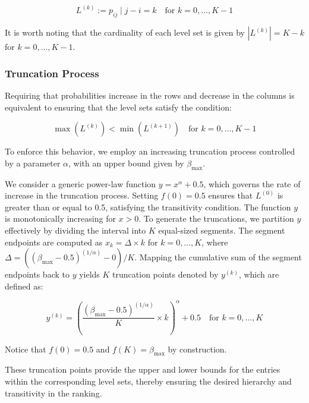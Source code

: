 \documentclass[11pt]{amsart}
\begin{document}
\begin{equation}
L^{(k)} := { p_{ij} \mid j-i = k } \quad \text{for } k = 0, \ldots, K-1
\end{equation}

It is worth noting that the cardinality of each level set is given by $|L^{(k)}| = K - k$ for $k = 0, \ldots, K-1$.

\subsubsection{Truncation Process}

Requiring that probabilities increase in the rows and decrease in the columns is equivalent to ensuring that the level sets satisfy the condition:

\begin{equation}
\max(L^{(k)}) < \min(L^{(k+1)}) \quad \text{for } k = 0, \ldots, K-1
\end{equation}

To enforce this behavior, we employ an increasing truncation process controlled by a parameter $\alpha$, with an upper bound given by $\beta_{\max}$.

We consider a generic power-law function $y = x^\alpha + 0.5$, which governs the rate of increase in the truncation process. Setting $f(0) = 0.5$ ensures that $L^{(0)}$ is greater than or equal to 0.5, satisfying the transitivity condition. The function $y$ is monotonically increasing for $x > 0$. To generate the truncations, we partition $y$ effectively by dividing the interval into $K$ equal-sized segments. The segment endpoints are computed as $x_k = \Delta \times k$ for $k = 0, \ldots, K$, where $\Delta = \left( \left(\beta_{\max} - 0.5\right)^{(1/\alpha)} - 0 \right) / K$. Mapping the cumulative sum of the segment endpoints back to $y$ yields $K$ truncation points denoted by $y^{(k)}$, which are defined as:

\begin{equation}
\label{eq:truncations}
y^{(k)} = \left( \frac{(\beta_{\max} - 0.5)^{(1/\alpha)}}{K} \times k \right)^\alpha + 0.5 \quad \text{for } k = 0, \ldots, K
\end{equation}

Notice that $f(0) = 0.5$ and $f(K) = \beta_{\max}$ by construction.

These truncation points provide the upper and lower bounds for the entries within the corresponding level sets, thereby ensuring the desired hierarchy and transitivity in the ranking.
\end{document}
